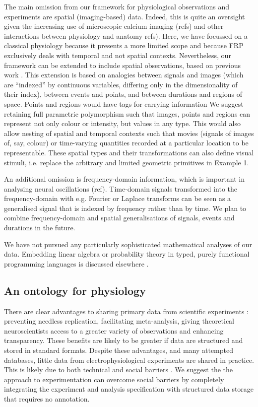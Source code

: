 The main omission from our framework for physiological observations
and experiments are spatial (imaging-based) data. Indeed, this is
quite an oversight given the increasing use of microscopic calcium
imaging (refs) and other interactions between physiology and anatomy
refs). Here, we have focussed on a classical physiology because it
presents a more limited scope and because FRP exclusively deals with
temporal and not spatial contexts. Nevertheless, our framework can be
extended to include spatial observations, based on previous work
\citep{Elliott2003}. This extension is based on analogies between
signals and images (which are ``indexed'' by continuous variables,
differing only in the dimensionality of their index), between events
and points, and between durations and regions of space. Points and
regions would have tags for carrying information We suggest retaining
full parametric polymorphism such that images, points and regions can
represent not only colour or intensity, but values in any type. This
would also allow nesting of spatial and temporal contexts such that
movies (signals of images of, say, colour) or time-varying quantities
recorded at a particular location \citep[for instance spot calcium
measurements as points of signals of concentration;][]{DiGregorio1999}
to be representable. These spatial types and their transformations can
also define visual stimuli, i.e. replace the arbitrary and limited
geometric primitives in Example 1.

An additional omission is frequency-domain information, which is
important in analysing neural oscillations (ref). Time-domain signals
transformed into the frequency-domain with e.g. Fourier or Laplace
transforms can be seen as a generalised signal that is indexed by
frequency rather than by time. We plan to combine frequency-domain and
spatial generalisations of signals, events and durations in the future.

We have not pursued any particularly sophisticated mathematical
analyses of our data. Embedding linear algebra or probability theory
in typed, purely functional programming languages is discussed
elsewhere \citep{Eaton2006, Park2005}.

\subsection*{An ontology for physiology}

There are clear advantages to sharing primary data from scientific
experiments \citep{Insel2003}: preventing needless replication,
facilitating meta-analysis, giving theoretical neuroscientists access
to a greater variety of observations and enhancing transparency. These
benefits are likely to be greater if data are structured and stored in
standard formats. Despite these advantages, and many attempted
databases, little data from electrophysiological experiments are
shared in practice. This is likely due to both technical and social
barriers \citep{Amari2002}. We suggest the the approach to
experimentation can overcome social barriers by completely integrating
the experiment and analysis specification with structured data storage
that requires no annotation. 

